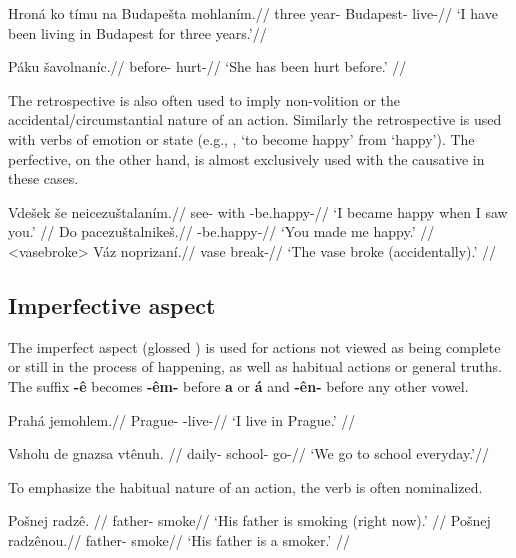 \begingl
\gla Hroná ko tímu na Budape\v{s}ta mohlan\'im.//
\glb three  year-  Budapest- live-//
\glft `I have been living in Budapest for three years.'//
\endgl
\xe

\begingl
\gla Páku \v{s}avolnan\'ic.//
\glb before- hurt-//
\glft `She has been hurt before.' //
\endgl
\xe

\par The retrospective is also often used to imply non-volition or the  accidental/circumstantial nature of an action. Similarly the retrospective is used with verbs of emotion or state (e.g., , ‘to become happy’ from  ‘happy’). The perfective, on the other hand, is almost exclusively used with the causative in these cases.

\pex
\a	\begingl
\gla Vde\v{s}ek \v{s}e neicezu\v{s}talan\'im.//
\glb see- with -be.happy-//
\glft `I became happy when I saw you.' //
\endgl
\a	\begingl
\gla Do pacezu\v{s}talnike\v{s}.//
\glb {} -be.happy-//
\glft `You made me happy.' //
\endgl
\xe
\pex<vasebroke>
\begingl
\gla Váz noprizan\'i.//
\glb vase break-//
\glft `The vase broke (accidentally).' //
\endgl
\xe

\subsection{Imperfective aspect}

\par The imperfect aspect (glossed ) is used for actions not viewed as being complete or still in the process of happening, as well as habitual actions or general truths. The suffix \textbf{-ê} becomes \textbf{-êm-} before \textbf{a} or \textbf{á} and \textbf{-ên-} before any other vowel. 

\pex
\begingl
\gla Prahá jemohlem.//
\glb Prague- -live-//
\glft `I live in Prague.' //
\endgl
\xe

\pex
\begingl
\gla Vsholu de gnazsa vtênuh. //
\glb daily-   school- go-//
\glft `We go to school everyday.'//
\endgl
\xe

\par To emphasize the habitual nature of an action, the verb is often nominalized.

\pex
\a	\begingl
	\gla Po\v{s}nej radzê. //
	\glb father- smoke//
	\glft `His father is smoking (right now).' //
	\endgl
\a	\begingl
	\gla Po\v{s}nej radzênou.//
	\glb father- smoke//
	\glft `His father is a smoker.' //
	\endgl
\xe

